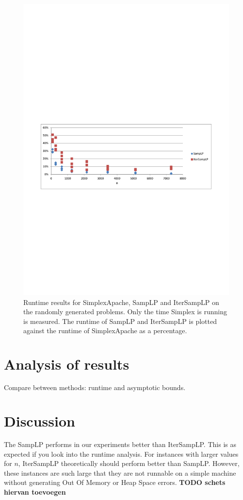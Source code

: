 \documentclass[nocopyrightspace]{acm_proc_article-sp}
\begin{document}
\begin{figure}[h!]
\includegraphics[width=\columnwidth]{../Results/simplexruntime_relative_simplex.pdf}
\caption{Runtime results for SimplexApache, SampLP and IterSampLP on the randomly generated problems. Only the time Simplex is running is measured. The runtime of SampLP and IterSampLP is plotted against the runtime of SimplexApache as a percentage.}
\label{fig:simplexruntime_relative_simplex}
\end{figure}



\section{Analysis of results}
Compare between methods: runtime and asymptotic bounds.

\section{Discussion}
The SampLP performs in our experiments better than IterSampLP. This is as expected if you look into the runtime analysis. For instances with larger values for $n$, IterSampLP theoretically should perform better than SampLP. However, these instances are such large that they are not runnable on a simple machine without generating Out Of Memory or Heap Space errors. 
\textbf{TODO schets hiervan toevoegen}
\end{document}
